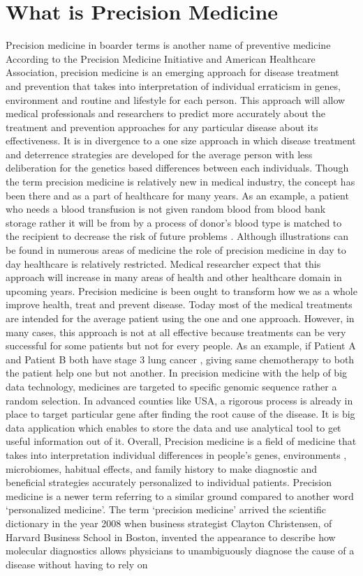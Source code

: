 \documentclass[sigconf]{acmart}
\begin{document}
\section{What is Precision Medicine}
Precision medicine in boarder terms is another name of preventive medicine According to the Precision Medicine Initiative and American Healthcare Association, precision medicine is an emerging approach for disease treatment and prevention that takes into interpretation of individual erraticism in genes, environment and routine and lifestyle for each person. This approach will allow medical professionals and researchers to predict more accurately about the treatment and prevention approaches for any particular disease about its effectiveness. It is in divergence to a one size approach in which disease treatment and deterrence strategies are developed for the average person with less deliberation for the genetics based differences between each individuals. Though the term precision medicine is relatively new in medical industry, the concept has been there and as a part of healthcare for many years. As an example, a patient who needs a blood transfusion is not given random blood from blood bank storage rather it will be from by a process of donor’s blood type is matched to the recipient to decrease the risk of future problems \cite{editor04}. Although illustrations can be found in numerous areas of medicine the role of precision medicine in day to day healthcare is relatively restricted. Medical researcher expect that this approach will increase in many areas of health and other healthcare domain in upcoming years. Precision medicine is been ought to transform how we as a whole improve health, treat and prevent disease. Today most of the medical treatments are intended for the average patient using the one and one approach. However, in many cases, this approach is not at all effective because treatments can be very successful for some patients but not for every people\cite{editor03}. As an example, if Patient A and Patient B both have stage 3 lung cancer , giving same chemotherapy to both the patient help one but not another. In precision medicine with the help of big data technology, medicines are targeted to specific genomic sequence rather a random selection.  In advanced counties like USA, a rigorous process is already in place to target particular gene after finding the root cause of the disease. It is big data application which enables to store the data and use analytical tool to get useful information out of it. Overall, Precision medicine is a field of medicine that takes into interpretation individual differences in people’s genes, environments , microbiomes, habitual effects, and family history to make diagnostic and beneficial strategies accurately personalized to individual patients. Precision medicine is a newer term referring to a similar ground compared to another word ‘personalized medicine’. The term ‘precision medicine’ arrived the scientific dictionary in the year 2008 when business strategist Clayton Christensen, of Harvard Business School in Boston, invented the appearance to describe how molecular diagnostics allows physicians to unambiguously diagnose the cause of a disease without having to rely on 
\end{document}
